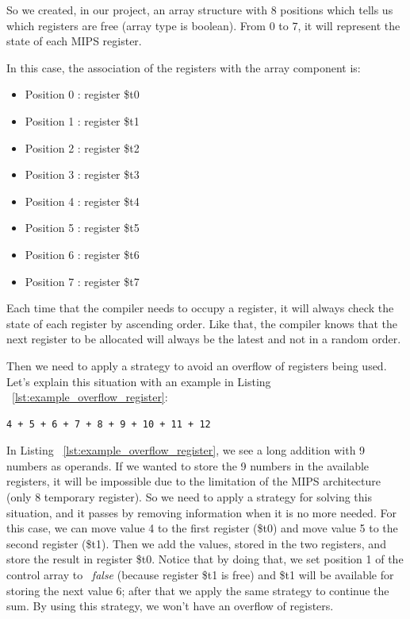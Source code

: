 \documentclass[
  oneside,
  11pt, a4paper,
  footinclude=true,
  headinclude=true,
  cleardoublepage=empty
]{scrbook}
\begin{document}
So we created, in our project, an array structure with 8 positions which tells us which registers are free (array type is boolean).
From 0 to 7, it will represent the state of each MIPS register.

In this case, the association of the registers with the array component is:

\begin{itemize}
\item Position 0 : register \$t0
\item Position 1 : register \$t1
\item Position 2 : register \$t2
\item Position 3 : register \$t3
\item Position 4 : register \$t4
\item Position 5 : register \$t5
\item Position 6 : register \$t6
\item Position 7 : register \$t7
\end{itemize}

Each time that the compiler needs to occupy a register, it will always check the state of each register by ascending order. Like that, the compiler knows that the next register to be allocated will  always be the latest and not in a random order.

Then we need to apply a strategy to avoid an overflow of registers being used.
Let's explain this situation with an example in Listing ~\ref{lst:example_overflow_register}:

\begin{lstlisting}[caption={Example of a sum operation with some numbers},label={lst:example_overflow_register}]
  4 + 5 + 6 + 7 + 8 + 9 + 10 + 11 + 12 
\end{lstlisting}

In Listing ~\ref{lst:example_overflow_register}, we see a long addition with 9 numbers as operands. 
If we wanted to store the 9 numbers in the available registers, it will be impossible due to the limitation of the MIPS architecture (only 8 temporary register).
So we need to apply a strategy for solving this situation, and it passes by removing information when it is no more needed.
For this case, we can move value 4 to the first register (\$t0) and move value 5 to the second register (\$t1). Then we add the values, stored in the two registers, and store the result in register \$t0. Notice that by doing that, we set position 1 of the control array to ~\textit{false} (because register \$t1 is free) and \$t1 will be available for storing the next value 6; after that we apply the same strategy to continue the sum. 
By using this strategy, we won't have an overflow of registers.
\end{document}
